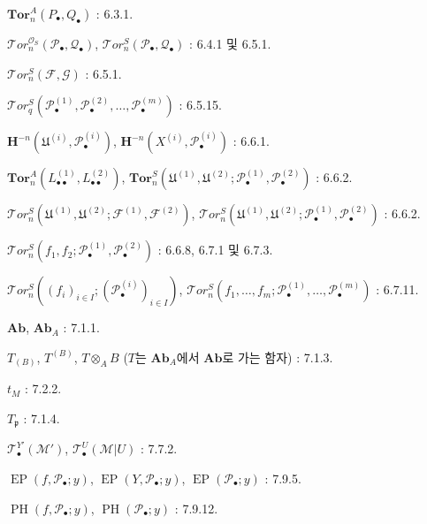\begin{flushleft}
$\mathbf{Tor}_n^A(P_\bullet,Q_\bullet)$ : 6.3.1.

\medskip
$\mathscr{T}\!or_n^{\mathscr O_S}(\mathscr P_\bullet,\mathscr Q_\bullet)$,
$\mathscr{T}\!or_n^S(\mathscr P_\bullet,\mathscr Q_\bullet)$ : 6.4.1 및 6.5.1.

\medskip
$\mathscr{T}\!or_n^S(\mathscr F,\mathscr G)$ : 6.5.1.

\medskip
$\mathscr{T}\!or_q^S(\mathscr P_\bullet^{(1)},\mathscr P_\bullet^{(2)},\ldots,
\mathscr P_\bullet^{(m)})$ : 6.5.15.

\medskip
$\mathbf H^{-n}(\mathfrak U^{(i)},\mathscr P_\bullet^{(i)})$,
$\mathbf H^{-n}(X^{(i)},\mathscr P_\bullet^{(i)})$ : 6.6.1.

\medskip
$\mathbf{Tor}_n^A(L_{\bullet\bullet}^{(1)},L_{\bullet\bullet}^{(2)})$,
$\mathbf{Tor}_n^S(\mathfrak U^{(1)},\mathfrak U^{(2)};
\mathscr P_\bullet^{(1)},\mathscr P_\bullet^{(2)})$ : 6.6.2.

\medskip
$\mathscr{T}\!or_n^S(\mathfrak U^{(1)},\mathfrak U^{(2)};
\mathscr F^{(1)},\mathscr F^{(2)})$,
$\mathscr{T}\!or_n^S(\mathfrak U^{(1)},\mathfrak U^{(2)};
\mathscr P_\bullet^{(1)},\mathscr P_\bullet^{(2)})$ : 6.6.2.

\medskip
$\mathscr{T}\!or_n^S(f_1,f_2;\mathscr P_\bullet^{(1)},
\mathscr P_\bullet^{(2)})$ : 6.6.8, 6.7.1 및 6.7.3.

\medskip
$\mathscr{T}\!or_n^S((f_i)_{i\in I};(\mathscr P_\bullet^{(i)})_{i\in I})$,
$\mathscr{T}\!or_n^S(f_1,\ldots,f_m;\mathscr P_\bullet^{(1)},\ldots,
\mathscr P_\bullet^{(m)})$ : 6.7.11.

\medskip
$\mathbf{Ab}$, $\mathbf{Ab}_A$ : 7.1.1.

\medskip
$T_{(B)}$, $T^{(B)}$, $T\otimes_A B$
($T$는 $\mathbf{Ab}_A$에서 $\mathbf{Ab}$로 가는 함자) : 7.1.3.

\medskip
$t_M$ : 7.2.2.

\medskip
$T_{\mathfrak p}$ : 7.1.4.

\medskip
$\mathscr T_\bullet^{Y'}(\mathscr M')$,
$\mathscr T_\bullet^U(\mathscr M|U)$ : 7.7.2.

\medskip
$\operatorname{EP}(f,\mathscr P_\bullet;y)$,
$\operatorname{EP}(Y,\mathscr P_\bullet;y)$,
$\operatorname{EP}(\mathscr P_\bullet;y)$ : 7.9.5.

\medskip
$\operatorname{PH}(f,\mathscr P_\bullet;y)$,
$\operatorname{PH}(\mathscr P_\bullet;y)$ : 7.9.12.
\end{flushleft}

\clearpage
{}
